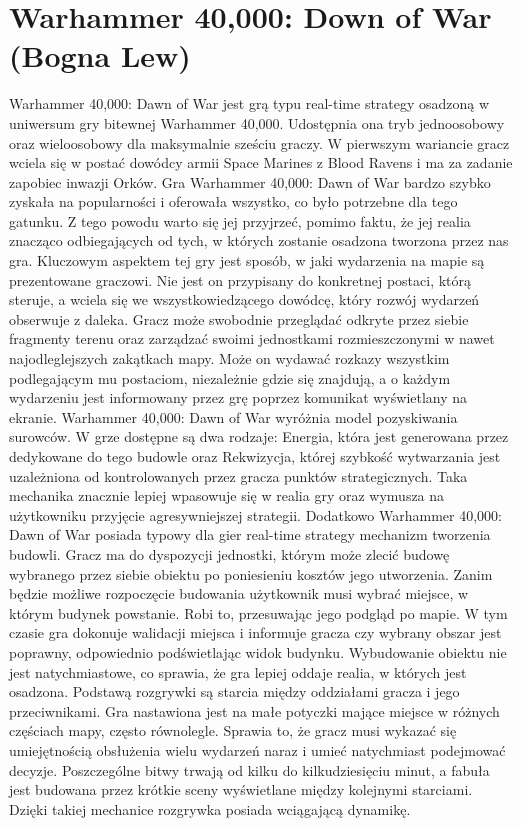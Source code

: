 \section{Warhammer 40,000: Down of War (Bogna Lew)}

Warhammer 40,000: Dawn of War jest grą typu real-time strategy osadzoną w uniwersum gry bitewnej Warhammer 40,000. Udostępnia
ona tryb jednoosobowy oraz wieloosobowy dla maksymalnie sześciu graczy. W pierwszym wariancie gracz wciela się w postać dowódcy
armii Space Marines z Blood Ravens i ma za zadanie zapobiec inwazji Orków. Gra Warhammer 40,000: Dawn of War bardzo szybko
zyskała na popularności i oferowała wszystko, co było potrzebne dla tego gatunku. Z tego powodu warto się jej przyjrzeć,
pomimo faktu, że jej realia znacząco odbiegających od tych, w których zostanie osadzona tworzona przez nas gra.
Kluczowym aspektem tej gry jest sposób, w jaki wydarzenia na mapie są prezentowane graczowi. Nie jest on przypisany do
konkretnej postaci, którą steruje, a wciela się we wszystkowiedzącego dowódcę, który rozwój wydarzeń obserwuje z daleka.
Gracz może swobodnie przeglądać odkryte przez siebie fragmenty terenu oraz zarządzać swoimi jednostkami rozmieszczonymi
w nawet najodleglejszych zakątkach mapy. Może on wydawać rozkazy wszystkim podlegającym mu postaciom, niezależnie gdzie
się znajdują, a o każdym wydarzeniu jest informowany przez grę poprzez komunikat wyświetlany na ekranie.
Warhammer 40,000: Dawn of War wyróżnia model pozyskiwania surowców. W grze dostępne są dwa rodzaje: Energia, która jest
generowana przez dedykowane do tego budowle oraz Rekwizycja, której szybkość wytwarzania jest uzależniona od kontrolowanych
przez gracza punktów strategicznych. Taka mechanika znacznie lepiej wpasowuje się w realia gry oraz wymusza na użytkowniku
przyjęcie agresywniejszej strategii.
Dodatkowo Warhammer 40,000: Dawn of War posiada typowy dla gier real-time strategy mechanizm tworzenia budowli. Gracz ma
do dyspozycji jednostki, którym może zlecić budowę wybranego przez siebie obiektu po poniesieniu kosztów jego utworzenia.
Zanim będzie możliwe rozpoczęcie budowania użytkownik musi wybrać miejsce, w którym budynek powstanie. Robi to, przesuwając
jego podgląd po mapie. W tym czasie gra dokonuje walidacji miejsca i informuje gracza czy wybrany obszar jest poprawny,
odpowiednio podświetlając widok budynku. Wybudowanie obiektu nie jest natychmiastowe, co sprawia, że gra lepiej oddaje
realia, w których jest osadzona.
Podstawą rozgrywki są starcia między oddziałami gracza i jego przeciwnikami. Gra nastawiona jest na małe potyczki mające
miejsce w różnych częściach mapy, często równolegle. Sprawia to, że gracz musi wykazać się umiejętnością obsłużenia wielu
wydarzeń naraz i umieć natychmiast podejmować decyzje. Poszczególne bitwy trwają od kilku do kilkudziesięciu minut, a
fabuła jest budowana przez krótkie sceny wyświetlane między kolejnymi starciami. Dzięki takiej mechanice rozgrywka
posiada wciągającą dynamikę.
